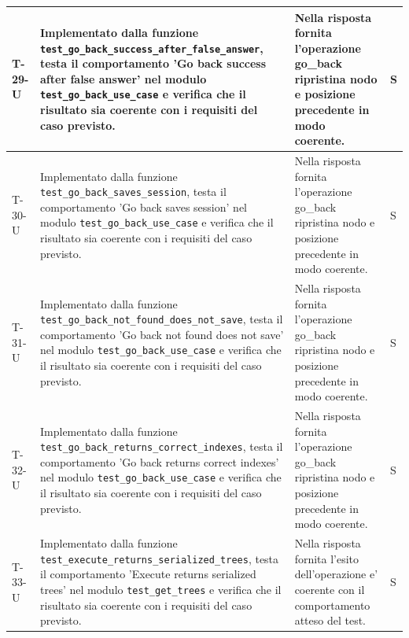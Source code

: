 \documentclass[a4paper,12pt]{article}
\begin{document}
{{\begin{longtable}{|>{\RaggedRight\arraybackslash}p{1.55cm}|>{\RaggedRight\arraybackslash}p{8.0cm}|>{\RaggedRight\arraybackslash}p{4.6cm}|>{\RaggedRight\arraybackslash}p{1.2cm}|}
        \hline
        T-29-U & Implementato dalla funzione \texttt{test\_\allowbreak go\_\allowbreak back\_\allowbreak success\_\allowbreak after\_\allowbreak false\_\allowbreak answer}, testa il comportamento 'Go back success after false answer' nel modulo \texttt{test\_\allowbreak go\_\allowbreak back\_\allowbreak use\_\allowbreak case} e verifica che il risultato sia coerente con i requisiti del caso previsto. & Nella risposta fornita l'operazione go\_back ripristina nodo e posizione precedente in modo coerente. & S \\
        \hline
        T-30-U & Implementato dalla funzione \texttt{test\_\allowbreak go\_\allowbreak back\_\allowbreak saves\_\allowbreak session}, testa il comportamento 'Go back saves session' nel modulo \texttt{test\_\allowbreak go\_\allowbreak back\_\allowbreak use\_\allowbreak case} e verifica che il risultato sia coerente con i requisiti del caso previsto. & Nella risposta fornita l'operazione go\_back ripristina nodo e posizione precedente in modo coerente. & S \\
        \hline
        T-31-U & Implementato dalla funzione \texttt{test\_\allowbreak go\_\allowbreak back\_\allowbreak not\_\allowbreak found\_\allowbreak does\_\allowbreak not\_\allowbreak save}, testa il comportamento 'Go back not found does not save' nel modulo \texttt{test\_\allowbreak go\_\allowbreak back\_\allowbreak use\_\allowbreak case} e verifica che il risultato sia coerente con i requisiti del caso previsto. & Nella risposta fornita l'operazione go\_back ripristina nodo e posizione precedente in modo coerente. & S \\
        \hline
        T-32-U & Implementato dalla funzione \texttt{test\_\allowbreak go\_\allowbreak back\_\allowbreak returns\_\allowbreak correct\_\allowbreak indexes}, testa il comportamento 'Go back returns correct indexes' nel modulo \texttt{test\_\allowbreak go\_\allowbreak back\_\allowbreak use\_\allowbreak case} e verifica che il risultato sia coerente con i requisiti del caso previsto. & Nella risposta fornita l'operazione go\_back ripristina nodo e posizione precedente in modo coerente. & S \\
        \hline
        T-33-U & Implementato dalla funzione \texttt{test\_\allowbreak execute\_\allowbreak returns\_\allowbreak serialized\_\allowbreak trees}, testa il comportamento 'Execute returns serialized trees' nel modulo \texttt{test\_\allowbreak get\_\allowbreak trees} e verifica che il risultato sia coerente con i requisiti del caso previsto. & Nella risposta fornita l'esito dell'operazione e' coerente con il comportamento atteso del test. & S \\

\end{longtable}}}
\end{document}
